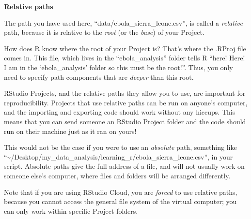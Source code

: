 \documentclass[
  letterpaper,
  DIV=11,
  numbers=noendperiod]{scrreprt}
\begin{document}
\begin{tcolorbox}[enhanced jigsaw, title=\textcolor{quarto-callout-note-color}{\faInfo}\hspace{0.5em}{Key Point}, colbacktitle=quarto-callout-note-color!10!white, leftrule=.75mm, arc=.35mm, opacityback=0, bottomrule=.15mm, rightrule=.15mm, toptitle=1mm, breakable, toprule=.15mm, colback=white, coltitle=black, colframe=quarto-callout-note-color-frame, bottomtitle=1mm, titlerule=0mm, left=2mm, opacitybacktitle=0.6]

\textbf{Relative paths}

The path you have used here, ``data/ebola\_sierra\_leone.csv'', is
called a \emph{relative} path, because it is relative to the \emph{root}
(or the \emph{base}) of your Project.

How does R know where the root of your Project is? That's where the
.RProj file comes in. This file, which lives in the ``ebola\_analysis''
folder tells R ``here! Here! I am in the `ebola\_analysis' folder so
this must be the root!''. Thus, you only need to specify path components
that are \emph{deeper} than this root.

RStudio Projects, and the relative paths they allow you to use, are
important for reproducibility. Projects that use relative paths can be
run on anyone's computer, and the importing and exporting code should
work without any hiccups. This means that you can send someone an
RStudio Project folder and the code should run on their machine just as
it ran on yours!

This would not be the case if you were to use an \emph{absolute} path,
something like
``\textasciitilde/Desktop/my\_data\_analysis/learning\_r/ebola\_sierra\_leone.csv'',
in your script. Absolute paths give the full address of a file, and will
not usually work on someone else's computer, where files and folders
will be arranged differently.

\end{tcolorbox}

\begin{tcolorbox}[enhanced jigsaw, title=\textcolor{quarto-callout-note-color}{\faInfo}\hspace{0.5em}{RStudio Cloud}, colbacktitle=quarto-callout-note-color!10!white, leftrule=.75mm, arc=.35mm, opacityback=0, bottomrule=.15mm, rightrule=.15mm, toptitle=1mm, breakable, toprule=.15mm, colback=white, coltitle=black, colframe=quarto-callout-note-color-frame, bottomtitle=1mm, titlerule=0mm, left=2mm, opacitybacktitle=0.6]

Note that if you are using RStudio Cloud, you are \emph{forced} to use
relative paths, because you cannot access the general file system of the
virtual computer; you can only work within specific Project folders.

\end{tcolorbox}
\end{document}
